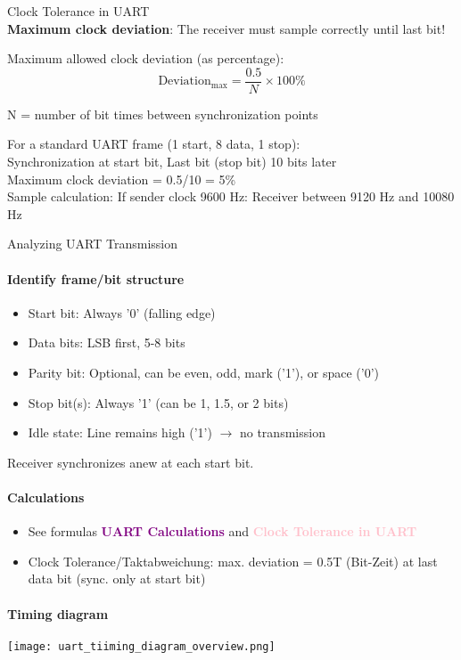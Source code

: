 \begin{KR}{Clock Tolerance in UART}\\
\textbf{Maximum clock deviation}:
The receiver must sample correctly until last bit!

Maximum allowed clock deviation (as percentage):
$$\text{Deviation}_{\max} = \frac{0.5}{N} \times 100\%$$

\small {N = number of bit times between synchronization points}
\end{KR}

\begin{example}
    For a standard UART frame (1 start, 8 data, 1 stop):\\
    Synchronization at start bit,
    Last bit (stop bit) 10 bits later
    \vspace{1mm}\\
    Maximum clock deviation = 0.5/10 = 5\%\\
    Sample calculation:
    If sender clock 9600 Hz: Receiver between 9120 Hz and 10080 Hz
\end{example}

\multend

\begin{KR}{Analyzing UART Transmission}


\paragraph{Identify frame/bit structure}
\begin{itemize}
    \item Start bit: Always '0' (falling edge)
    \item Data bits: LSB first, 5-8 bits
    \item Parity bit: Optional, can be even, odd, mark ('1'), or space ('0')
    \item Stop bit(s): Always '1' (can be 1, 1.5, or 2 bits)
    \item Idle state: Line remains high ('1') $\rightarrow$ no transmission
\end{itemize}
Receiver synchronizes anew at each start bit.

\paragraph{Calculations}
\begin{itemize}
    \item See formulas \textcolor{purple}{\textbf{UART Calculations}} and \textcolor{pink}{\textbf{Clock Tolerance in UART}}
    \item Clock Tolerance/Taktabweichung: max. deviation = 0.5T (Bit-Zeit) at last data bit (sync. only at start bit)
\end{itemize}

\paragraph{Timing diagram}
\texttt{[image: uart\_tiiming\_diagram\_overview.png]}
\end{KR}


